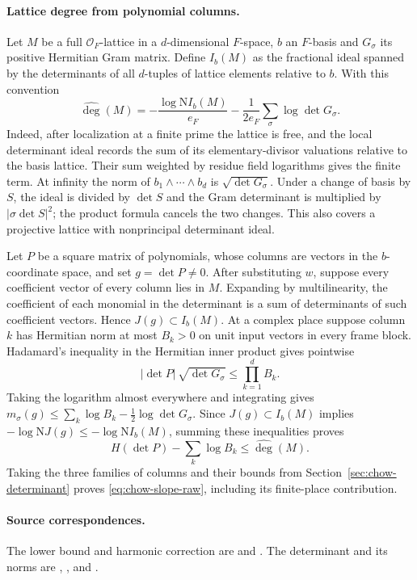 \paragraph{Lattice degree from polynomial columns.}
Let \(M\) be a full \(\mathcal O_F\)-lattice in a \(d\)-dimensional
\(F\)-space, \(b\) an \(F\)-basis and \(G_\sigma\) its positive Hermitian
Gram matrix. Define \(I_b(M)\) as the fractional ideal spanned by the
determinants of all \(d\)-tuples of lattice elements relative to \(b\).
With this convention
\[
 \widehat{\deg}(M)=-\frac{\log\mathrm N I_b(M)}{e_F}
                 -\frac1{2e_F}\sum_\sigma\log\det G_\sigma .
\]
Indeed, after localization at a finite prime the lattice is free, and
the local determinant ideal records the sum of its elementary-divisor
valuations relative to the basis lattice. Their sum weighted by residue
field logarithms gives the finite term. At infinity the norm of
\(b_1\wedge\cdots\wedge b_d\) is \(\sqrt{\det G_\sigma}\).
Under a change of basis by \(S\), the ideal is divided by \(\det S\)
and the Gram determinant is multiplied by \(|\sigma\det S|^2\);
the product formula cancels the two changes. This also covers a
projective lattice with nonprincipal determinant ideal.

Let \(P\) be a square matrix of polynomials, whose columns are vectors
in the \(b\)-coordinate space, and set \(g=\det P\ne0\).
After substituting \(w\), suppose every coefficient vector of every
column lies in \(M\). Expanding by multilinearity, the coefficient
of each monomial in the determinant is a sum of determinants of such
coefficient vectors. Hence \(J(g)\subset I_b(M)\).
At a complex place suppose column \(k\) has Hermitian norm at most
\(B_k>0\) on unit input vectors in every frame block. Hadamard's
inequality in the Hermitian inner product gives pointwise
\[
 |\det P|\,\sqrt{\det G_\sigma}\le\prod_{k=1}^{d}B_k.
\]
Taking the logarithm almost everywhere and integrating gives
\(m_\sigma(g)\le\sum_k\log B_k-\tfrac12\log\det G_\sigma\).
Since \(J(g)\subset I_b(M)\) implies
\(-\log\mathrm N J(g)\le-\log\mathrm N I_b(M)\),
summing these inequalities proves
\[
 H(\det P)-\sum_k\log B_k\le\widehat{\deg}(M).
\]
Taking the three families of columns and their bounds from
Section~\ref{sec:chow-determinant} proves \eqref{eq:chow-slope-raw},
including its finite-place contribution.

\paragraph{Source correspondences.}
The lower bound and harmonic correction are
 and .
The determinant and its norms are
,
, and
.
